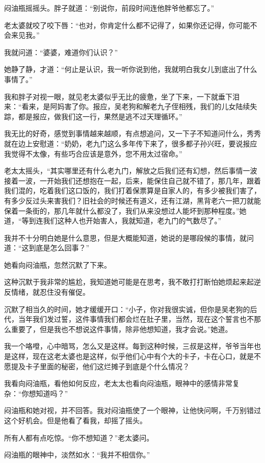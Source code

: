 闷油瓶摇摇头。胖子就道：“别说你，前段时间连他胖爷他都忘了。”

老太婆就咬了咬下唇：“也对，你肯定什么都不记得了，如果你还记得，你可能不会来见我。”

我就问道：“婆婆，难道你们认识？”

她静了静，才道：“何止是认识，我一听你说到他，我就明白我女儿到底出了什么事情了。”

我和胖子对视一眼，就见老太婆似乎无比的疲惫，坐了下来，一下就垂下泪来：“看来，是阿妈害了你。报应，吴老狗和解老九子侄相残，我们的儿女陆续失踪，都是报应，做我们这一行，果然是逃不过天理循环。”

我无比的好奇，感觉到事情越来越顺，有点想追问，又一下子不知道问什么，秀秀就在边上安慰道：“奶奶，老九门这么多年传下来了，很多都子孙兴旺，要说报应我觉得不太像，有些巧合应该是意外，您不用太过宿命。”

老太太摇头，“其实哪里还有什么老九门，解放之后我们还有幻想，然后事情一波接着一波，一开始我们还想抱在一起，后来，能保住自己就不错了，那几年，跟着我们混的，吃着我们这口饭的，我们打着保票算是自家人的，有多少被我们害了，有多少反过头来害我们？旧社会的时候还有道义，还有江湖，黑背老六一把刀就能保着一条街的，那几年就什么都没了，我们从来没想过人能坏到那种程度。”她道，“等到连我们这种人也开始害人，我就知道，老九门的气数尽了。”

我并不十分明白她是什么意思，但是大概能知道，她说的是哪段候的事情，就问道：“这到底是怎么回事？”

她看向闷油瓶，忽然沉默了下来。

这种沉默于我非常的尴尬，我知道她可能是在思考，我不敢打打断怕她烦起来起逆反情绪，就忍住没有催促。

沉默了相当久的时间，她才缓缓开口：“小子，你对我很实诚，但你是吴老狗的后代，当年我们发过誓，这件事情我们都会烂在肚子里，当然，现在这个誓言也不那么重要了，但是我也不想说这件事情，除非他想知道，我才会说。”她道。

我一个咯噔，心中暗骂，怎么又是这样。每到这种时候，三叔是这样，爷爷当年也是这样，现在这老太婆也是这样，似乎他们心中有个大的卡子，卡在心口，就是不愿提及卡子里面的秘密，他们这烂摊子到底是个什么情况？

我看向闷油瓶，看他如何反应，老太太也看向闷油瓶，眼神中的感情非常复杂：“你想知道吗？”

闷油瓶和她对视，并不回答。我对闷油瓶使了一个眼神，让他快问啊，千万别错过这个好机会。但是他看了看我，却摇了摇头。

所有人都有点吃惊。“你不想知道？”老太婆问。

闷油瓶的眼神中，淡然如水：“我并不相信你。”

